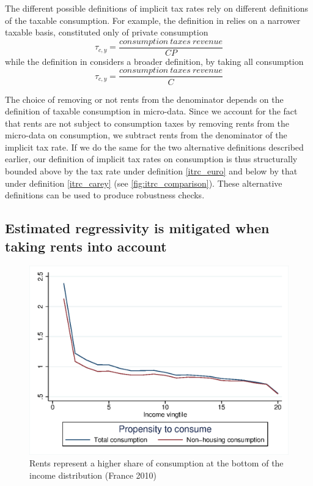 The different possible definitions of implicit tax rates rely on different definitions of the taxable consumption. For example, the definition in \cite{euro2016taxation} relies on a narrower taxable basis, constituted only of private consumption
\begin{equation}
    \label{itrc_euro}
    \tau_{c,y} = \frac{consumption\ taxes\ revenue}{CP}
\end{equation}
while the definition in \cite{carey2000average} considers a broader definition, by taking all consumption
\begin{equation}
    \label{itrc_carey}
    \tau_{c,y} = \frac{consumption\ taxes\ revenue}{C}
\end{equation}

The choice of removing or not rents from the denominator depends on the definition of taxable consumption in micro-data. Since we account for the fact that rents are not subject to consumption taxes by removing rents from the micro-data on consumption, we subtract rents from the denominator of the implicit tax rate. If we do the same for the two alternative definitions described earlier, our definition of implicit tax rates on consumption is thus structurally bounded above by the tax rate under definition \eqref{itrc_euro} and below by that under definition \eqref{itrc_carey} (see \cref{fig:itrc_comparison}). These alternative definitions can be used to produce robustness checks.

\subsection{Estimated regressivity is mitigated when taking rents into account}
\label{sec:rents}
\begin{figure}[!h]
\centering
\includegraphics[height=0.4\textheight]{"images/18-11-18 total_nonrent_propensity fr10"}
\caption{Rents represent a higher share of consumption at the bottom of the income distribution (France 2010)}
\label{fig:total_nonrent}  
\end{figure}

